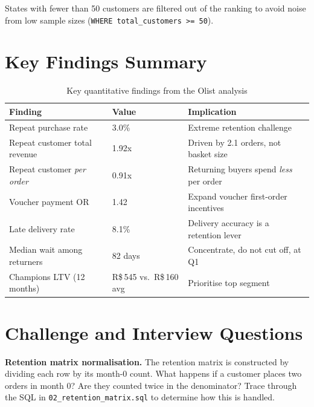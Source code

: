 States with fewer than 50 customers are filtered out of the ranking to avoid
noise from low sample sizes (\texttt{WHERE total\_customers >= 50}).

\section{Key Findings Summary}
\label{sec:ecom-findings}

\begin{table}[h]
\centering
\caption{Key quantitative findings from the Olist analysis}
\label{tab:ecom-findings}
\begin{tabular}{lll}
\toprule
\textbf{Finding} & \textbf{Value} & \textbf{Implication} \\
\midrule
Repeat purchase rate          & 3.0\%   & Extreme retention challenge \\
Repeat customer total revenue & 1.92x   & Driven by 2.1 orders, not basket size \\
Repeat customer \emph{per order}  & 0.91x   & Returning buyers spend \emph{less} per order \\
Voucher payment OR            & 1.42    & Expand voucher first-order incentives \\
Late delivery rate            & 8.1\%   & Delivery accuracy is a retention lever \\
Median wait among returners   & 82 days & Concentrate, do not cut off, at Q1 \\
Champions LTV (12 months)     & R\$\,545 vs.\ R\$\,160 avg & Prioritise top segment \\
\bottomrule
\end{tabular}
\end{table}

\section{Challenge and Interview Questions}
\label{sec:ecom-questions}

\begin{challengebox}
\textbf{Retention matrix normalisation.} The retention matrix is constructed by
dividing each row by its month-0 count. What happens if a customer places two
orders in month 0? Are they counted twice in the denominator? Trace through the
SQL in \texttt{02\_retention\_matrix.sql} to determine how this is handled.
\end{challengebox}

